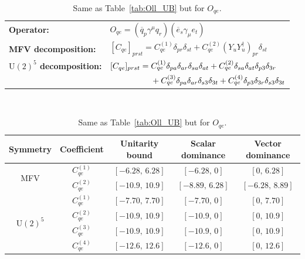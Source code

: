 \begin{table}[tbp]
\centering
{\small
\begin{tabular}{ll}
    \textbf{Operator:} &
        $\boxed{O_{qe} = (\overline q_p \gamma^\mu q_r)(\overline e_s \gamma_\mu e_t)}$ \\[0.2cm]
    \textbf{MFV decomposition:} &
        $[C_{qe}]_{prst} = C_{qe}^{(1)}\delta_{pr}\delta_{st} + C_{qe}^{(2)}(Y_u Y_u^\dagger)_{pr}\delta_{st}$ \\[0.15cm]
    \textbf{$\mathrm{U}(2)^5$ decomposition:} &
        $[C_{qe}]_{prst} =
            C_{qe}^{(1)}\Pij{p}{r}{a}\Pij{s}{t}{a}
            + C_{qe}^{(2)}\Pij{s}{t}{a}\delta_{p3}\delta_{3r}$ \\
        & $\phantom{[C_{qe}]_{prst} ={}}+ C_{qe}^{(3)}\Pij{p}{r}{a}\delta_{s3}\delta_{3t}
            + C_{qe}^{(4)}\delta_{p3}\delta_{3r}\delta_{s3}\delta_{3t}$ \\
\end{tabular}
\\[0.3cm]
\renewcommand{\arraystretch}{1.3}
\begin{tabular}{ccccc}
    \toprule
    \rowcolor{hdrcolor}
    \textbf{Symmetry} & \textbf{Coefficient}
        & \textbf{Unitarity bound}
        & \textbf{Scalar dominance}
        & \textbf{Vector dominance} \\
    \midrule
    \multirow{2}{*}{MFV}
        & $C_{qe}^{(1)}$ & $[-6.28,\, 6.28]$  & $[-6.28,\, 0]$    & $[0,\, 6.28]$    \\
        & $C_{qe}^{(2)}$ & $[-10.9,\, 10.9]$  & $[-8.89,\, 6.28]$ & $[-6.28,\, 8.89]$ \\
    \midrule
    \multirow{4}{*}{$\mathrm{U}(2)^5$}
        & $C_{qe}^{(1)}$ & $[-7.70,\, 7.70]$ & $[-7.70,\, 0]$ & $[0,\, 7.70]$ \\
        & $C_{qe}^{(2)}$ & $[-10.9,\, 10.9]$ & $[-10.9,\, 0]$ & $[0,\, 10.9]$ \\
        & $C_{qe}^{(3)}$ & $[-10.9,\, 10.9]$ & $[-10.9,\, 0]$ & $[0,\, 10.9]$ \\
        & $C_{qe}^{(4)}$ & $[-12.6,\, 12.6]$ & $[-12.6,\, 0]$ & $[0,\, 12.6]$ \\
    \bottomrule
\end{tabular}}
\caption{Same as Table~\ref{tab:Oll_UB} but for $O_{qe}$.}
\label{tab:Oqe_UB}
\end{table}


